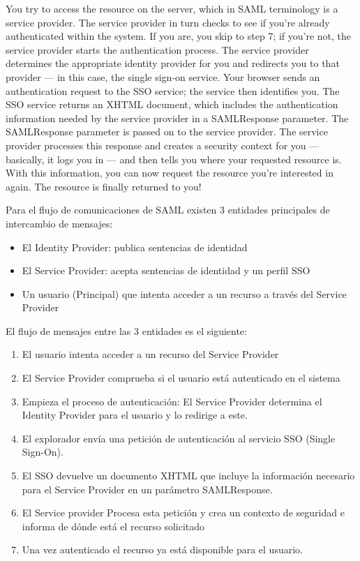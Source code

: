 \documentclass[10pt,a4paper]{article}
\begin{document}
You try to access the resource on the server, which in SAML terminology is a service provider. The service provider in turn checks to see if you're already authenticated within the system. If you are, you skip to step 7; if you're not, the service provider starts the authentication process.
The service provider determines the appropriate identity provider for you and redirects you to that provider — in this case, the single sign-on service.
Your browser sends an authentication request to the SSO service; the service then identifies you.
The SSO service returns an XHTML document, which includes the authentication information needed by the service provider in a SAMLResponse parameter.
The SAMLResponse parameter is passed on to the service provider.
The service provider processes this response and creates a security context for you — basically, it logs you in — and then tells you where your requested resource is.
With this information, you can now request the resource you're interested in again.
The resource is finally returned to you!

Para el flujo de comunicaciones de SAML existen 3 entidades principales de intercambio de mensajes:
\begin{itemize}
\item El Identity Provider: publica sentencias de identidad
\item El Service Provider: acepta sentencias de identidad y un perfil SSO
\item Un usuario (Principal) que intenta acceder a un recurso a través del Service Provider
\end{itemize}
El flujo de mensajes entre las 3 entidades es el siguiente:
\begin{enumerate}
\item El usuario intenta acceder a un recurso del Service Provider
\item El Service Provider comprueba si el usuario está autenticado en el sistema
\item Empieza el proceso de autenticación: El Service Provider determina el Identity Provider para el usuario y lo redirige a este.
\item El explorador envía una petición de autenticación al servicio SSO (Single Sign-On).
\item El SSO devuelve un documento XHTML que incluye la información necesario para el Service Provider en un parámetro SAMLResponse.
\item El Service provider Procesa esta petición y crea un contexto de seguridad e informa de dónde está el recurso solicitado
\item Una vez autenticado el recurso ya está disponible para el usuario.
\end{enumerate}
\end{document}
